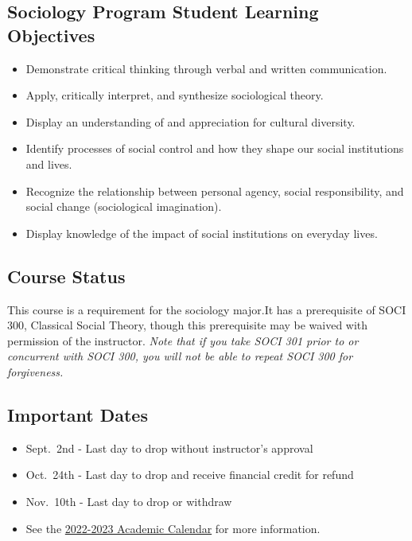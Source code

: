 \documentclass[11pt,]{article}
\providecommand{\tightlist}{%
  \setlength{\itemsep}{0pt}\setlength{\parskip}{0pt}}
\begin{document}
\hypertarget{sociology-program-student-learning-objectives}{%
\subsection{Sociology Program Student Learning
Objectives}\label{sociology-program-student-learning-objectives}}

\begin{itemize}
\tightlist
\item
  Demonstrate critical thinking through verbal and written
  communication.
\item
  Apply, critically interpret, and synthesize sociological theory.
\item
  Display an understanding of and appreciation for cultural diversity.
\item
  Identify processes of social control and how they shape our social
  institutions and lives.
\item
  Recognize the relationship between personal agency, social
  responsibility, and social change (sociological imagination).
\item
  Display knowledge of the impact of social institutions on everyday
  lives.
\end{itemize}

\hypertarget{course-status}{%
\subsection{Course Status}\label{course-status}}

This course is a requirement for the sociology major.It has a
prerequisite of SOCI 300, Classical Social Theory, though this
prerequisite may be waived with permission of the instructor. \emph{Note
that if you take SOCI 301 prior to or concurrent with SOCI 300, you will
not be able to repeat SOCI 300 for forgiveness.}

\hypertarget{important-dates}{%
\subsection{Important Dates}\label{important-dates}}

\begin{itemize}
\tightlist
\item
  Sept.~2nd - Last day to drop without instructor's approval\\
\item
  Oct.~24th - Last day to drop and receive financial credit for refund\\
\item
  Nov.~10th - Last day to drop or withdraw\\
\item
  See the
  \href{https://www.csuchico.edu/apss/calendar/aca-cal-2022-23.shtml}{2022-2023
  Academic Calendar} for more information.
\end{itemize}
\end{document}
